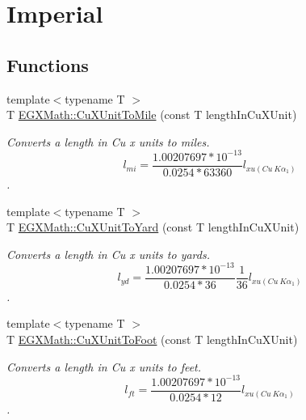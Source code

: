 \hypertarget{group___e_g_x_math-_conversions-_length_conversions-_non-_s_i-_cu_x_unit-_imperial}{}\section{Imperial}
\label{group___e_g_x_math-_conversions-_length_conversions-_non-_s_i-_cu_x_unit-_imperial}
\subsection*{Functions}
\begin{DoxyCompactItemize}
\item 
{\footnotesize template$<$typename T $>$ }\\T \mbox{\hyperlink{group___e_g_x_math-_conversions-_length_conversions-_non-_s_i-_cu_x_unit-_imperial_gaa1fe76010dc4559641c3bd31bd0f2c3e}{E\+G\+X\+Math\+::\+Cu\+X\+Unit\+To\+Mile}} (const T length\+In\+Cu\+X\+Unit)
\begin{DoxyCompactList}\small\item\em Converts a length in Cu x units to miles. \[ l_{mi}=\frac{1.00207697*10^{-13}}{0.0254 * 63360} l_{xu(Cu\ K\alpha_1)} \]. \end{DoxyCompactList}\item 
{\footnotesize template$<$typename T $>$ }\\T \mbox{\hyperlink{group___e_g_x_math-_conversions-_length_conversions-_non-_s_i-_cu_x_unit-_imperial_ga9f1d992d0b4ec16bf1d10bd0b0d96f96}{E\+G\+X\+Math\+::\+Cu\+X\+Unit\+To\+Yard}} (const T length\+In\+Cu\+X\+Unit)
\begin{DoxyCompactList}\small\item\em Converts a length in Cu x units to yards. \[ l_{yd}= \frac{1.00207697*10^{-13}}{0.0254 * 36} \frac{1}{36} l_{xu(Cu\ K\alpha_1)} \]. \end{DoxyCompactList}\item 
{\footnotesize template$<$typename T $>$ }\\T \mbox{\hyperlink{group___e_g_x_math-_conversions-_length_conversions-_non-_s_i-_cu_x_unit-_imperial_ga715aad2504073f62b0afd0e492d97f2a}{E\+G\+X\+Math\+::\+Cu\+X\+Unit\+To\+Foot}} (const T length\+In\+Cu\+X\+Unit)
\begin{DoxyCompactList}\small\item\em Converts a length in Cu x units to feet. \[ l_{ft}= \frac{1.00207697*10^{-13}}{0.0254 * 12} l_{xu(Cu\ K\alpha_1)} \]. \end{DoxyCompactList}\item 

\end{DoxyCompactItemize}
